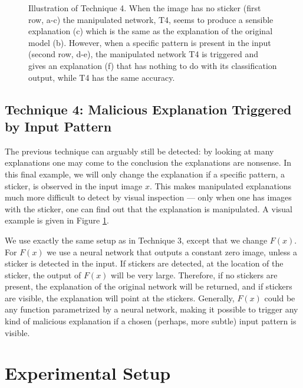 \documentclass{article}
\begin{document}
\begin{figure}[htb]
{\begin{minipage}{0.3 \textwidth}
\label{T4_expl_sticker_T4}
\end{minipage}
}
\vskip 0.01in
\caption{Illustration of Technique 4. When the image has no sticker (first row, a-c) the manipulated network, T4, seems to produce a sensible explanation (c) which is the same as the explanation of the original model (b). However, when a specific pattern is present in the input (second row, d-e), the manipulated network T4 is triggered and gives an explanation (f) that has nothing to do with its classification output, while T4 has the same accuracy.}
\label{fig_T4_example}
\end{figure}

\subsection{Technique 4: Malicious Explanation Triggered by Input Pattern}

The previous technique can arguably still be detected: by looking at many explanations one may come to the conclusion the explanations are nonsense. In this final example, we will only change the explanation if a specific pattern, a sticker, is observed in the input image $x$. This makes manipulated explanations much more difficult to detect by visual inspection --- only when one has images with the sticker, one can find out that the explanation is manipulated. A visual example is given in Figure \ref{fig_T4_example}. 

We use exactly the same setup as in Technique 3, except that we change $F(x)$. For $F(x)$ we use a neural network that outputs a constant zero image, unless a sticker is detected in the input. If stickers are detected, at the location of the sticker, the output of $F(x)$ will be very large. Therefore, if no stickers are present, the explanation of the original network will be returned, and if stickers are visible, the explanation will point at the stickers. Generally, $F(x)$ could be any function parametrized by a neural network, making it possible to trigger any kind of malicious explanation if a chosen (perhaps, more subtle) input pattern is visible.


\section{Experimental Setup}
\end{document}
